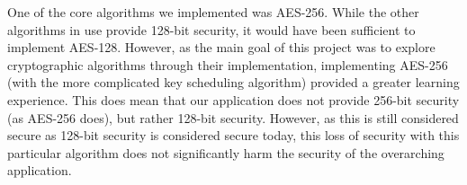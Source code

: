 One of the core algorithms we implemented was AES-256. While the other algorithms in use provide 128-bit security,
it would have been sufficient to implement AES-128. However, as the main goal of this project was to explore cryptographic 
algorithms through their implementation, implementing AES-256 (with the more complicated key scheduling algorithm) provided 
a greater learning experience. This does mean that our application does not provide 256-bit security (as AES-256 does), but rather 128-bit security.
However, as this is still considered secure as 128-bit security is considered secure today, this loss of security with this particular 
algorithm does not significantly harm the security of the overarching application.
